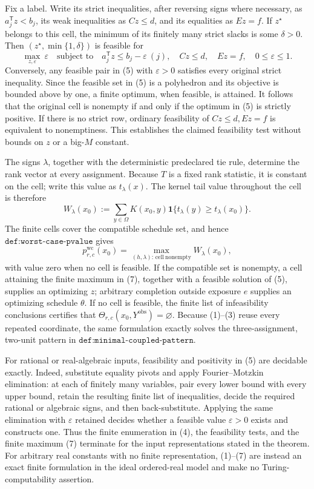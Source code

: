 Fix a label.  Write its strict inequalities, after reversing signs where necessary, as \(a_j^{\mathsf T}z<b_j\), its weak inequalities as \(Cz\leq d\), and its equalities as \(Ez=f\).  If \(z^\star\) belongs to this cell, the minimum of its finitely many strict slacks is some \(\delta>0\).  Then \((z^\star,\min\{1,\delta\})\) is feasible for
\[
 \max_{z,\varepsilon}\ \varepsilon
 \quad\text{subject to}\quad
 a_j^{\mathsf T}z\leq b_j-\varepsilon\ (j),\quad
 Cz\leq d,\quad Ez=f,\quad0\leq\varepsilon\leq1.
\tag{5}
\]
Conversely, any feasible pair in (5) with \(\varepsilon>0\) satisfies every original strict inequality.  Since the feasible set in (5) is a polyhedron and its objective is bounded above by one, a finite optimum, when feasible, is attained.  It follows that the original cell is nonempty if and only if the optimum in (5) is strictly positive.  If there is no strict row, ordinary feasibility of \(Cz\leq d,Ez=f\) is equivalent to nonemptiness.  This establishes the claimed feasibility test without bounds on \(z\) or a big-\(M\) constant.

The signs \(\lambda\), together with the deterministic predeclared tie rule, determine the rank vector at every assignment.  Because \(T\) is a fixed rank statistic, it is constant on the cell; write this value as \(t_\lambda(x)\).  The kernel tail value throughout the cell is therefore
\[
 W_\lambda(x_0)
 :=\sum_{y\in\Omega}K(x_0,y)
 \mathbf 1\{t_\lambda(y)\geq t_\lambda(x_0)\}.
\tag{6}
\]
The finite cells cover the compatible schedule set, and hence \(\texttt{def:worst-case-pvalue}\) gives
\[
 p^{\mathrm{wc}}_{r,c}(x_0)
 =\max_{(h,\lambda):\,\mathrm{cell\ nonempty}}W_\lambda(x_0),
\tag{7}
\]
with value zero when no cell is feasible.  If the compatible set is nonempty, a cell attaining the finite maximum in (7), together with a feasible solution of (5), supplies an optimizing \(z\); arbitrary completion outside exposure \(e\) supplies an optimizing schedule \(\theta\).  If no cell is feasible, the finite list of infeasibility conclusions certifies that \(\Theta_{r,c}(x_0,Y^{\mathrm{obs}})=\varnothing\).  Because (1)--(3) reuse every repeated coordinate, the same formulation exactly solves the three-assignment, two-unit pattern in \(\texttt{def:minimal-coupled-pattern}\).

For rational or real-algebraic inputs, feasibility and positivity in (5) are decidable exactly.  Indeed, substitute equality pivots and apply Fourier--Motzkin elimination: at each of finitely many variables, pair every lower bound with every upper bound, retain the resulting finite list of inequalities, decide the required rational or algebraic signs, and then back-substitute.  Applying the same elimination with \(\varepsilon\) retained decides whether a feasible value \(\varepsilon>0\) exists and constructs one.  Thus the finite enumeration in (4), the feasibility tests, and the finite maximum (7) terminate for the input representations stated in the theorem.  For arbitrary real constants with no finite representation, (1)--(7) are instead an exact finite formulation in the ideal ordered-real model and make no Turing-computability assertion.


